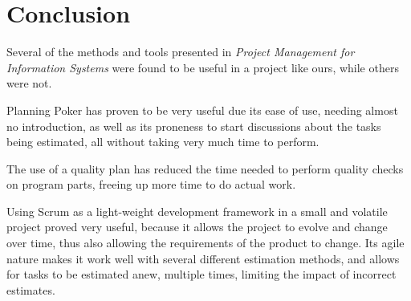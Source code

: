 \section{Conclusion}

Several of the methods and tools presented in \emph{Project Management for Information Systems}\cite{caye}
were found to be useful in a project like ours, while others were not.

Planning Poker has proven to be very useful due its ease of use, needing almost no introduction, as well
as its proneness to start discussions about the tasks being estimated, all without taking very much time
to perform.

The use of a quality plan has reduced the time needed to perform quality checks on program parts, freeing
up more time to do actual work.

Using Scrum as a light-weight development framework in a small and volatile project proved very useful,
because it allows the project to evolve and change over time, thus also allowing the requirements of the
product to change. Its agile nature makes it work well with several different estimation methods, and
allows for tasks to be estimated anew, multiple times, limiting the impact of incorrect estimates.